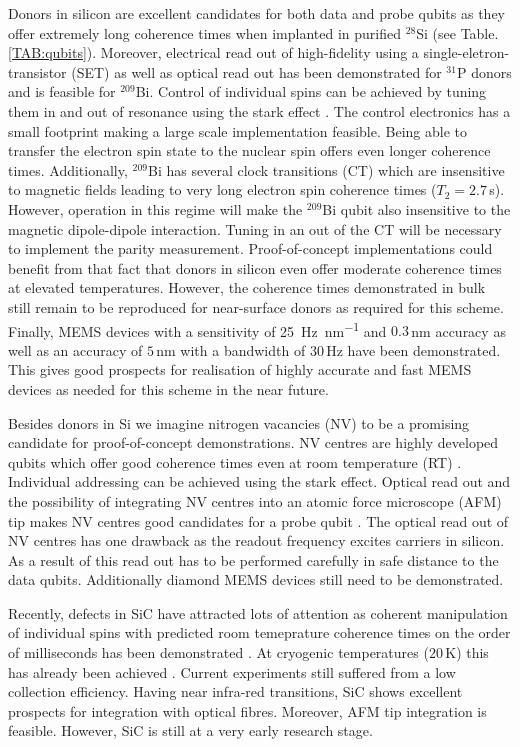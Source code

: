 Donors in silicon are excellent candidates for both data and probe qubits as they offer extremely long coherence times when implanted in purified $^{28}$Si (see Table.\@ \ref{TAB:qubits}). Moreover, electrical read out of high-fidelity using a single-eletron-transistor (SET) \cite{Pla2012,Pla2013,Muhonen2014} as well as optical \cite{Lo2015} read out has been demonstrated for $^{31}$P donors and is feasible for $^{209}$Bi. Control of individual spins can be achieved by tuning them in and out of resonance using the stark effect \cite{Pica2014}. The control electronics has a small footprint making a large scale implementation feasible. Being able to transfer the electron spin state to the nuclear spin offers even longer coherence times. Additionally, $^{209}$Bi has several clock transitions (CT) which are insensitive to magnetic fields leading to very long electron spin coherence times ($T_2=2.7\, $s). However, operation in this regime will make the $^{209}$Bi qubit also insensitive to the magnetic dipole-dipole interaction. Tuning in an out of the CT will be necessary to implement the parity measurement. Proof-of-concept implementations could benefit from that fact that donors in silicon even offer moderate coherence times at elevated temperatures. However, the coherence times demonstrated in bulk still remain to be reproduced for near-surface donors as required for this scheme.
Finally, MEMS devices with a sensitivity of \SI{25}{\hertz\per nm} and $0.3\, $nm accuracy \cite{Chu2003} as well as an accuracy of $5\, $nm with a bandwidth of $30\, $Hz have been demonstrated. This gives good prospects for realisation of highly accurate and fast MEMS devices as needed for this scheme in the near future. 

Besides donors in Si we imagine nitrogen vacancies (NV) to be a promising candidate for proof-of-concept demonstrations. NV centres are highly developed qubits \cite{Bar-Gill2013} which offer good coherence times even at room temperature (RT) \cite{Balasubramanian2009}. Individual addressing can be achieved using the stark effect. Optical read out and the possibility of integrating NV centres into an atomic force microscope (AFM) tip makes NV centres good candidates for a probe qubit \cite{Grinolds2013}. The optical read out of NV centres has one drawback as the readout frequency excites carriers in silicon. As a result of this read out has to be performed carefully in safe distance to the data qubits. Additionally diamond MEMS devices still need to be demonstrated.

Recently, defects in SiC have attracted lots of attention \cite{Morello2015} as coherent manipulation of individual spins with predicted room temeprature coherence times on the order of milliseconds has been demonstrated \cite{Widmann2014}. At cryogenic temperatures ($20\, $K) this has already been achieved \cite{Christle2014}. Current experiments still suffered from a low collection efficiency. Having near infra-red transitions, SiC shows excellent prospects for integration with optical fibres. Moreover, AFM tip integration is feasible. However, SiC is still at a very early research stage.  


